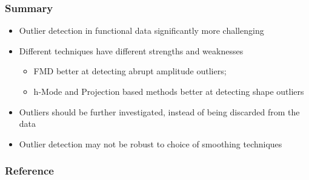 \documentclass[10pt,dvipsnames,table]{beamer}
\begin{document}
\begin{frame}
\frametitle{Summary}
\begin{itemize}
\item Outlier detection in functional data significantly more challenging
\item Different techniques have different strengths and weaknesses
\begin{itemize}
\item FMD better at detecting abrupt amplitude outliers; 
\item h-Mode and Projection based methods better at detecting shape outliers
\end{itemize}
\item Outliers should be further investigated, instead of being discarded from the data
\item Outlier detection may not be robust to choice of smoothing techniques
\end{itemize}

\end{frame}

\begin{frame}
\frametitle{Reference}
{\footnotesize{
    
    
}}
\end{frame}
\end{document}
